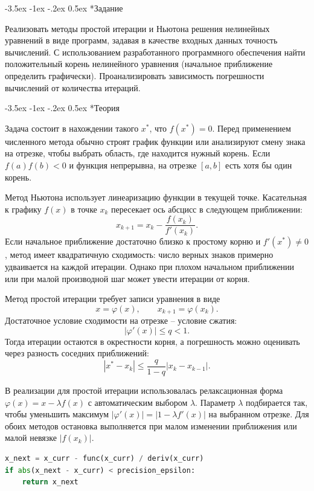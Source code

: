 \documentclass[14pt, a4paper]{article}
\makeatletter
\renewcommand\section{\@startsection {section}{1}{\parindent}%
  {-3.5ex \@plus -1ex \@minus -.2ex}%
  {0.5ex}%
  {\normalfont\Large\bfseries}}
\makeatother
\begin{document}
\section*{Задание}
Реализовать методы простой итерации и Ньютона решения нелинейных уравнений в виде программ, задавая в качестве входных данных точность вычислений. С использованием разработанного программного обеспечения найти положительный корень нелинейного уравнения (начальное приближение определить графически). Проанализировать зависимость погрешности вычислений от количества итераций.

\section*{Теория}
Задача состоит в нахождении такого $x^*$, что $f(x^*)=0$. Перед применением численного метода обычно строят график функции или анализируют смену знака на отрезке, чтобы выбрать область, где находится нужный корень. Если $f(a)f(b)<0$ и функция непрерывна, на отрезке $[a,b]$ есть хотя бы один корень.

Метод Ньютона использует линеаризацию функции в текущей точке. Касательная к графику $f(x)$ в точке $x_k$ пересекает ось абсцисс в следующем приближении:
\[
    x_{k+1}=x_k-\frac{f(x_k)}{f'(x_k)}.
\]
Если начальное приближение достаточно близко к простому корню и $f'(x^*)\ne0$, метод имеет квадратичную сходимость: число верных знаков примерно удваивается на каждой итерации. Однако при плохом начальном приближении или при малой производной шаг может увести итерации от корня.

Метод простой итерации требует записи уравнения в виде
\[
    x=\varphi(x), \qquad x_{k+1}=\varphi(x_k).
\]
Достаточное условие сходимости на отрезке -- условие сжатия:
\[
    |\varphi'(x)|\le q<1.
\]
Тогда итерации остаются в окрестности корня, а погрешность можно оценивать через разность соседних приближений:
\[
    |x^*-x_k|\le \frac{q}{1-q}|x_k-x_{k-1}|.
\]

В реализации для простой итерации использовалась релаксационная форма $\varphi(x)=x-\lambda f(x)$ с автоматическим выбором $\lambda$.
Параметр $\lambda$ подбирается так, чтобы уменьшить максимум $|\varphi'(x)|=|1-\lambda f'(x)|$ на выбранном отрезке. Для обоих методов остановка выполняется при малом изменении приближения или малой невязке $|f(x_k)|$.

\begin{lstlisting}[language=Python]
x_next = x_curr - func(x_curr) / deriv(x_curr)
if abs(x_next - x_curr) < precision_epsilon:
    return x_next
\end{lstlisting}
\end{document}
